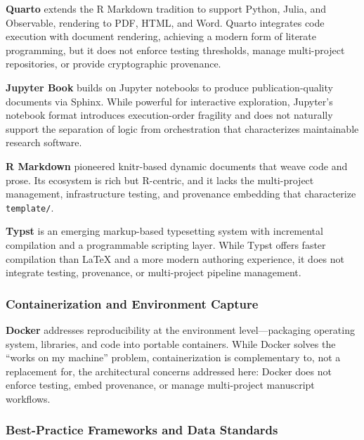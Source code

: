 \documentclass[
  english,
]{article}
\begin{document}
\textbf{Quarto} \citep{allaire2024quarto} extends the R Markdown
tradition to support Python, Julia, and Observable, rendering to PDF,
HTML, and Word. Quarto integrates code execution with document
rendering, achieving a modern form of literate programming, but it does
not enforce testing thresholds, manage multi-project repositories, or
provide cryptographic provenance.

\textbf{Jupyter Book} \citep{kluyver2016jupyter} builds on Jupyter
notebooks to produce publication-quality documents via Sphinx. While
powerful for interactive exploration, Jupyter's notebook format
introduces execution-order fragility \citep{pimentel2019jupyter} and
does not naturally support the separation of logic from orchestration
that characterizes maintainable research software.

\textbf{R Markdown} \citep{xie2018dynamic} pioneered knitr-based dynamic
documents that weave code and prose. Its ecosystem is rich but
R-centric, and it lacks the multi-project management, infrastructure
testing, and provenance embedding that characterize \texttt{template/}.

\textbf{Typst} \citep{madje2023typst} is an emerging markup-based
typesetting system with incremental compilation and a programmable
scripting layer. While Typst offers faster compilation than LaTeX and a
more modern authoring experience, it does not integrate testing,
provenance, or multi-project pipeline management.

\subsubsection{Containerization and Environment
Capture}\label{containerization-and-environment-capture}

\textbf{Docker} \citep{boettiger2015docker} addresses reproducibility at
the environment level---packaging operating system, libraries, and code
into portable containers. While Docker solves the ``works on my
machine'' problem, containerization is complementary to, not a
replacement for, the architectural concerns addressed here: Docker does
not enforce testing, embed provenance, or manage multi-project
manuscript workflows.

\subsubsection{Best-Practice Frameworks and Data
Standards}\label{best-practice-frameworks-and-data-standards}
\end{document}
